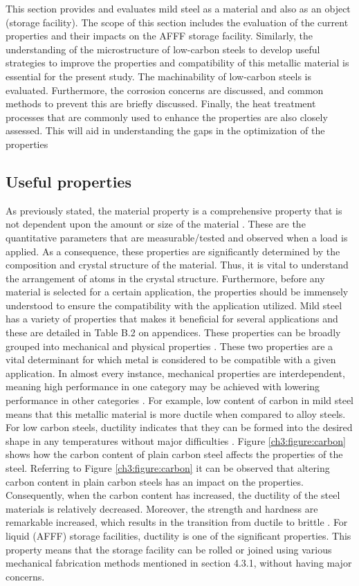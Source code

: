 \documentclass[12pt]{report}
\begin{document}
This section provides and evaluates mild steel as a material and also as an object (storage facility). The scope of this section includes the evaluation of the current properties and their impacts on the AFFF storage facility. Similarly, the understanding of the microstructure of low-carbon steels to develop useful strategies to improve the properties and compatibility of this metallic material is essential for the present study. The machinability of low-carbon steels is evaluated. Furthermore, the corrosion concerns are discussed, and common methods to prevent this are briefly discussed. Finally, the heat treatment processes that are commonly used to enhance the properties are also closely assessed. This will aid in understanding the gaps in the optimization of the properties

\subsection{Useful properties} 
As previously stated, the material property is a comprehensive property that is not dependent upon the amount or size of the material \cite{kabir2020critical}. These are the quantitative parameters that are measurable/tested and observed when a load is applied. As a consequence, these properties are significantly determined by the composition and crystal structure of the material. Thus, it is vital to understand the arrangement of atoms in the crystal structure. Furthermore, before any material is selected for a certain application, the properties should be immensely understood to ensure the compatibility with the application utilized.
Mild steel has a variety of properties that makes it beneficial for several applications and these are detailed in Table B.2 on appendices. These properties can be broadly grouped into mechanical and physical properties \cite{kabir2020critical}. These two properties are a vital determinant for which metal is considered to be compatible with a given application. In almost every instance, mechanical properties are interdependent, meaning high performance in one category may be achieved with lowering performance in other categories \cite{kabir2020critical}. For example, low content of carbon in mild steel means that this metallic material is more ductile when compared to alloy steels. 
For low carbon steels, ductility indicates that they can be formed into the desired shape in any temperatures without major difficulties \cite{dong2005deformation}. Figure \ref{ch3:figure:carbon} shows how the carbon content of plain carbon steel affects the properties of the steel. Referring to Figure \ref{ch3:figure:carbon} it can be observed that altering carbon content in plain carbon steels has an impact on the properties. Consequently, when the carbon content has increased, the ductility of the steel materials is relatively decreased. Moreover, the strength and hardness are remarkable increased, which results in the transition from ductile to brittle \cite{abou2001mechanical}. For liquid (AFFF) storage facilities, ductility is one of the significant properties. This property means that the storage facility can be rolled or joined using various mechanical fabrication methods mentioned in section 4.3.1, without having major concerns.
 
\end{document}
